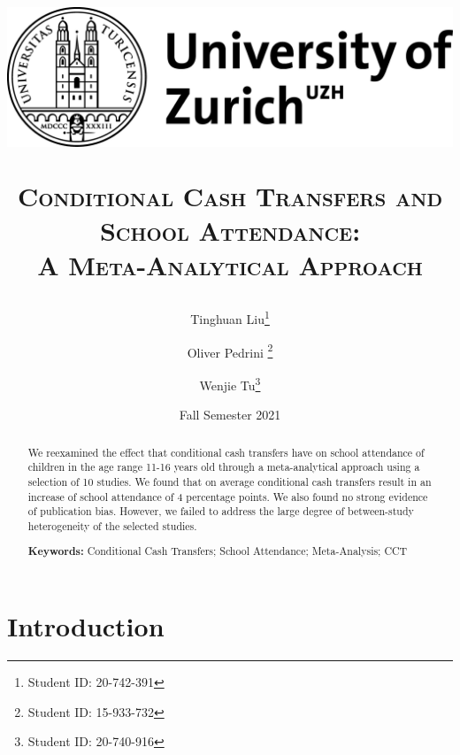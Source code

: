 \documentclass[a4paper, 10pt]{article}
\title{%
\begin{center}
    \includegraphics[scale=0.15]{figures/UZH2.png}
\end{center}
\vspace{4em}
     \textsc{Conditional Cash Transfers and School Attendance:\\A Meta-Analytical Approach}
}
\author{Tinghuan Liu\thanks{Student ID: 20-742-391} \and Oliver Pedrini \thanks{Student ID: 15-933-732}\and Wenjie Tu\thanks{Student ID: 20-740-916} }
\date{Fall Semester 2021}\setlength{\parindent}{0pt}
\begin{document}
\clearpage
\maketitle
\thispagestyle{empty}

\begin{abstract}
\noindent We reexamined the effect that conditional cash transfers have on school attendance of children in the age range 11-16 years old through a meta-analytical approach using a selection of 10 studies. We found that on average conditional cash transfers result in an increase of school attendance of 4 percentage points. We also found no strong evidence of publication bias. However, we failed to address the large degree of between-study heterogeneity of the selected studies.

\vspace{4mm}

\noindent\textbf{Keywords:} Conditional Cash Transfers; School Attendance; Meta-Analysis; CCT


\end{abstract}

\newpage


\doublespacing

\section{Introduction} \label{sec:introduction}
\end{document}
